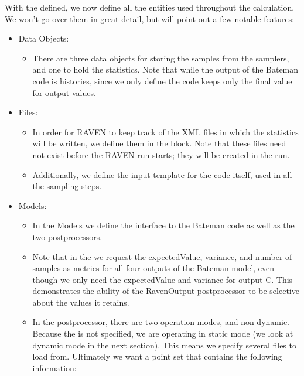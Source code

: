 With the  defined, we now define all the entities used throughout the calculation.  We won't go
over them in great detail, but will point out a few notable features:
\begin{itemize}
  \item Data Objects:
    \begin{itemize}
      \item There are three data objects for storing the samples from the samplers, and one to hold the
        statistics.  Note that while the output of the Bateman code is histories, since we only define
         the code keeps only the final value for output values.
    \end{itemize}
  \item Files:
    \begin{itemize}
      \item In order for RAVEN to keep track of the XML files in which the statistics will be written, we
        define them in the  block.  Note that these files need not exist before the RAVEN run
        starts; they will be created in the run.
      \item Additionally, we define the input template for the code itself, used in all the sampling steps.
    \end{itemize}
  \item Models:
    \begin{itemize}
      \item In the Models we define the interface to the Bateman code as well as the two postprocessors.
      \item Note that in the  we request the expectedValue, variance, and number of samples as
        metrics for all four outputs of the Bateman model, even though we only need the expectedValue and
        variance for output C.  This demonstrates the ability of the RavenOutput postprocessor to be selective
        about the values it retains.
      \item In the  postprocessor, there are two operation modes,  and
        non-dynamic.  Because the  is not specified, we are operating in static mode (we look
        at dynamic mode in the next section).  This means we specify several files to load from.  Ultimately
        we want a point set that contains the following information:
        \begin{center}
        \begin{tabular}{c | c | c }

\end{tabular}
\end{center}
\end{itemize}
\end{itemize}
